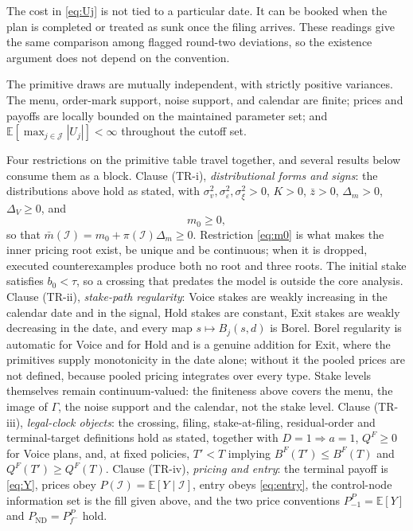 \documentclass[11pt]{article}
\makeatletter
\newcommand{\compatlabel}[2]{\begingroup\phantomsection\def\@currentlabel{#1}\label{#2}\endgroup}
\newcommand{\Eop}{\mathbb{E}}
\newcommand{\ND}{\mathrm{ND}}
\makeatother
\begin{document}
The cost in \eqref{eq:Uj} is not tied to a particular date. It can be booked when the plan is completed
or treated as sunk once the filing arrives. These readings give the same comparison among flagged
round-two deviations, so the existence argument does not depend on the convention.
\compatlabel{1}{rem:Ctiming}


The primitive draws are mutually independent, with strictly positive variances. The menu, order-mark
support, noise support, and calendar are finite; prices and payoffs are locally bounded on the
maintained parameter set; and $\Eop[\max_{j\in\mathcal J}|U_j|]<\infty$ throughout the cutoff set.

Four restrictions on the primitive table travel together, and several results below consume them as
a block. Clause (TR-i), \emph{distributional forms and signs}: the distributions above hold as
stated, with $\sigma_v^2,\sigma_\varepsilon^2,\sigma_\xi^2>0$, $K>0$, $\bar z>0$, $\Delta_m>0$,
$\Delta_V\geq0$, and
\begin{equation}
\label{eq:m0}
m_0\geq0,
\end{equation}
so that $\bar m(\mathcal I)=m_0+\pi(\mathcal I)\Delta_m\geq0$. Restriction \eqref{eq:m0} is what
makes the inner pricing root exist, be unique and be continuous; when it is dropped, executed
counterexamples produce both no root and three roots. The initial stake satisfies $b_0<\tau$, so a
crossing that predates the model is outside the core analysis. Clause (TR-ii), \emph{stake-path
regularity}: Voice stakes are weakly increasing in the calendar date and in the signal, Hold stakes
are constant, Exit stakes are weakly decreasing in the date, and every map $s\mapsto B_j(s,d)$ is
Borel. Borel regularity is automatic for Voice and for Hold and is a genuine addition for Exit,
where the primitives supply monotonicity in the date alone; without it the pooled prices are not
defined, because pooled pricing integrates over every type. Stake levels themselves remain
continuum-valued: the finiteness above covers the menu, the image of $\Gamma$, the noise support and
the calendar, not the stake level. Clause (TR-iii), \emph{legal-clock objects}: the crossing,
filing, stake-at-filing, residual-order and terminal-target definitions hold as stated, together
with $D=1\Rightarrow a=1$, $Q^F\geq0$ for Voice plans, and, at fixed policies, $T'<T$ implying
$B^F(T')\leq B^F(T)$ and $Q^F(T')\geq Q^F(T)$. Clause (TR-iv), \emph{pricing and entry}: the
terminal payoff is \eqref{eq:Y}, prices obey $P(\mathcal I)=\Eop[Y\mid\mathcal I]$, entry obeys
\eqref{eq:entry}, the control-node information set is the fill given above, and the two price
conventions $P_{-1}^P=\Eop[Y]$ and $P_{\ND}=P_{f^-}^P$ hold.\compatlabel{2}{asm:primitives}
\compatlabel{2(a)}{asm:A1}
\compatlabel{2(b)}{asm:A2p}
\compatlabel{2(c)}{asm:TR}
\end{document}
